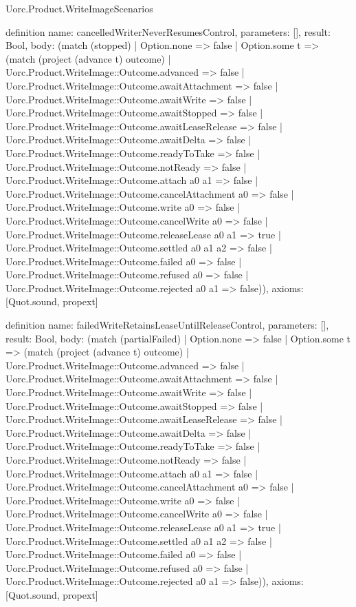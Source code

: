 \begin{lexlean}{Uorc.Product.WriteImageScenarios}
\begin{semanticmodule}
definition{
  name: cancelledWriterNeverResumesControl,
  parameters: [],
  result: Bool,
  body: (match (stopped)
    | Option.none => false
    | Option.some t => (match (project (advance t) outcome)
      | Uorc.Product.WriteImage::Outcome.advanced => false
      | Uorc.Product.WriteImage::Outcome.awaitAttachment => false
      | Uorc.Product.WriteImage::Outcome.awaitWrite => false
      | Uorc.Product.WriteImage::Outcome.awaitStopped => false
      | Uorc.Product.WriteImage::Outcome.awaitLeaseRelease => false
      | Uorc.Product.WriteImage::Outcome.awaitDelta => false
      | Uorc.Product.WriteImage::Outcome.readyToTake => false
      | Uorc.Product.WriteImage::Outcome.notReady => false
      | Uorc.Product.WriteImage::Outcome.attach a0 a1 => false
      | Uorc.Product.WriteImage::Outcome.cancelAttachment a0 => false
      | Uorc.Product.WriteImage::Outcome.write a0 => false
      | Uorc.Product.WriteImage::Outcome.cancelWrite a0 => false
      | Uorc.Product.WriteImage::Outcome.releaseLease a0 a1 => true
      | Uorc.Product.WriteImage::Outcome.settled a0 a1 a2 => false
      | Uorc.Product.WriteImage::Outcome.failed a0 => false
      | Uorc.Product.WriteImage::Outcome.refused a0 => false
      | Uorc.Product.WriteImage::Outcome.rejected a0 a1 => false)),
  axioms: [Quot.sound, propext]
}

definition{
  name: failedWriteRetainsLeaseUntilReleaseControl,
  parameters: [],
  result: Bool,
  body: (match (partialFailed)
    | Option.none => false
    | Option.some t => (match (project (advance t) outcome)
      | Uorc.Product.WriteImage::Outcome.advanced => false
      | Uorc.Product.WriteImage::Outcome.awaitAttachment => false
      | Uorc.Product.WriteImage::Outcome.awaitWrite => false
      | Uorc.Product.WriteImage::Outcome.awaitStopped => false
      | Uorc.Product.WriteImage::Outcome.awaitLeaseRelease => false
      | Uorc.Product.WriteImage::Outcome.awaitDelta => false
      | Uorc.Product.WriteImage::Outcome.readyToTake => false
      | Uorc.Product.WriteImage::Outcome.notReady => false
      | Uorc.Product.WriteImage::Outcome.attach a0 a1 => false
      | Uorc.Product.WriteImage::Outcome.cancelAttachment a0 => false
      | Uorc.Product.WriteImage::Outcome.write a0 => false
      | Uorc.Product.WriteImage::Outcome.cancelWrite a0 => false
      | Uorc.Product.WriteImage::Outcome.releaseLease a0 a1 => true
      | Uorc.Product.WriteImage::Outcome.settled a0 a1 a2 => false
      | Uorc.Product.WriteImage::Outcome.failed a0 => false
      | Uorc.Product.WriteImage::Outcome.refused a0 => false
      | Uorc.Product.WriteImage::Outcome.rejected a0 a1 => false)),
  axioms: [Quot.sound, propext]
}


\end{semanticmodule}
\end{lexlean}
